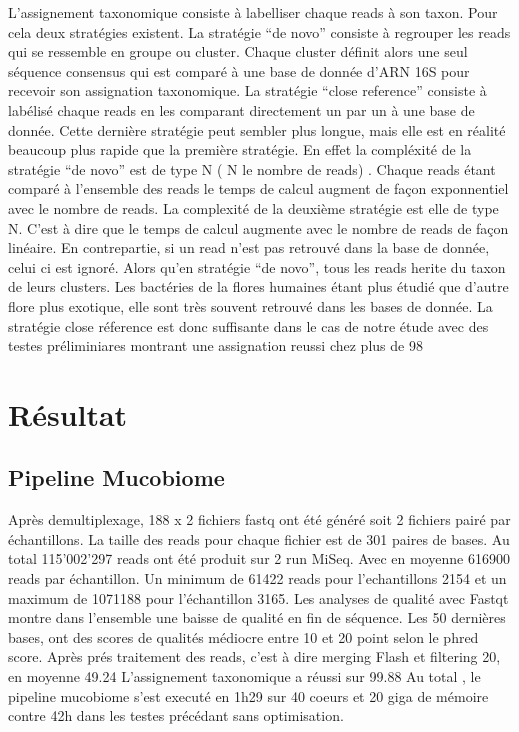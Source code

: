 \documentclass[12pt,a4paper]{article}
\begin{document}
L’assignement taxonomique consiste à labelliser chaque reads à son taxon. Pour cela deux stratégies existent.
La stratégie “de novo” consiste à regrouper les reads qui se ressemble en groupe ou cluster.
Chaque cluster définit alors une seul séquence consensus qui est comparé à une base de donnée d’ARN 16S pour recevoir son assignation taxonomique.
La stratégie “close reference” consiste à labélisé chaque reads en les comparant directement un par un à une base de donnée. Cette dernière stratégie peut sembler plus longue, mais elle est en réalité beaucoup plus rapide que la première stratégie. En effet la compléxité de la stratégie “de novo” est de type N ( N le nombre de reads) . Chaque reads étant comparé à l’ensemble des reads le temps de calcul augment de façon exponnentiel avec le nombre de reads.
La complexité de la deuxième stratégie est elle de type N. C’est à dire que le temps de calcul augmente avec le nombre de reads de façon linéaire. En contrepartie, si un read n’est pas retrouvé dans la base de donnée, celui ci est ignoré. Alors qu’en stratégie “de novo”, tous les reads herite du taxon de leurs clusters.
Les bactéries de la flores humaines étant plus étudié que d’autre flore plus exotique, elle sont très souvent retrouvé dans les bases de donnée. La stratégie close réference est donc suffisante dans le cas de notre étude avec des testes préliminiares montrant une assignation reussi chez plus de 98%

\section{Résultat}
\subsection{Pipeline Mucobiome}
Après demultiplexage, 188 x 2 fichiers fastq ont été généré soit 2 fichiers pairé par échantillons.
La taille des reads pour chaque fichier est de 301 paires de bases.
Au total 115’002’297 reads ont été produit sur 2 run MiSeq. Avec en moyenne 616900 reads par échantillon. Un minimum de 61422 reads pour l’echantillons 2154 et un maximum de 1071188 pour l’échantillon 3165.
Les analyses de qualité avec Fastqt montre dans l’ensemble une baisse de qualité en fin de séquence. Les 50 dernières bases, ont des scores de qualités médiocre entre 10 et 20 point selon le phred score.
Après prés traitement des reads, c’est à dire merging Flash et filtering 20, en moyenne 49.24 %
L’assignement taxonomique a réussi sur 99.88%
Au total , le pipeline mucobiome s’est executé en 1h29 sur 40 coeurs et 20 giga de mémoire contre 42h dans les testes précédant sans optimisation.
\end{document}
